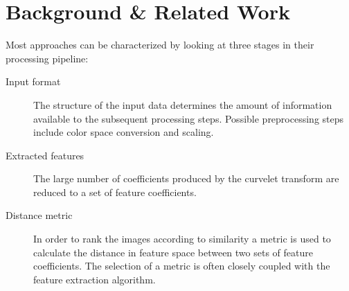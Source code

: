 \chapter{Background \& Related Work}\label{ch:background}
Most approaches can be characterized by looking at three stages in their processing pipeline:

\begin{description}
    \item[Input format] The structure of the input data determines the amount of information available to the subsequent processing steps. Possible preprocessing steps include color space conversion and scaling.
    \item[Extracted features] The large number of coefficients produced by the curvelet transform are reduced to a set of feature coefficients.
    \item[Distance metric] In order to rank the images according to similarity a metric is used to calculate the distance in feature space between two sets of feature coefficients. The selection of a metric is often closely coupled with the feature extraction algorithm.
\end{description}


